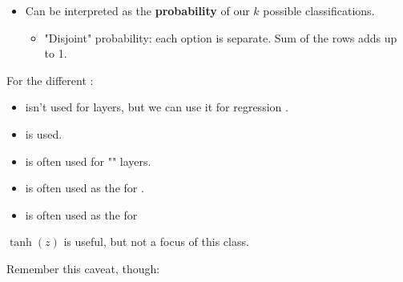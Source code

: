 \begin{itemize}
\begin{itemize}
                    \item Can be interpreted as the \textbf{probability} of our $k$ possible classifications.
                        \begin{itemize}
                            \item "Disjoint" probability: each option is separate. Sum of the rows adds up to 1.\\
                        \end{itemize}
                \end{itemize}
        \end{itemize}
        
        \begin{concept}
            For the different :
            
            \begin{itemize}
                \item {} isn't used for  layers, but we can use it for regression .
                
                \item {} is  used.
                
                \item {} is often used for "" layers.
                
                \item {} is often used as the  for .
                
                \item {} is often used as the  for  
            \end{itemize}
            $\tanh(z)$ is useful, but not a focus of this class.
        \end{concept}

        Remember this caveat, though:

